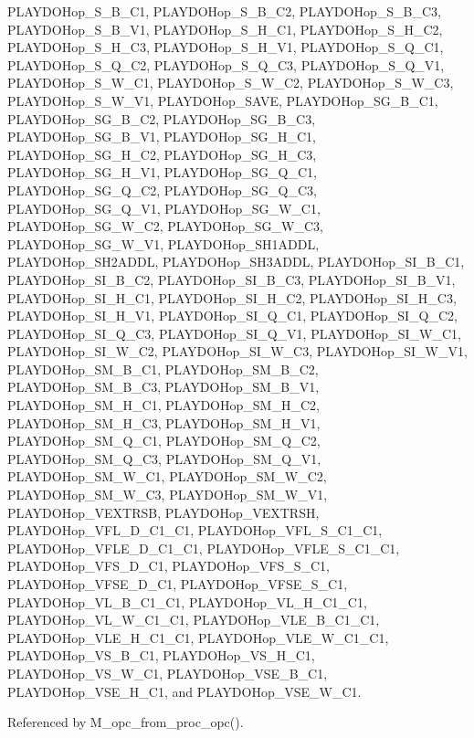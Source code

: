 PLAYDOHop\_\-S\_\-B\_\-C1, PLAYDOHop\_\-S\_\-B\_\-C2, PLAYDOHop\_\-S\_\-B\_\-C3, PLAYDOHop\_\-S\_\-B\_\-V1, PLAYDOHop\_\-S\_\-H\_\-C1, PLAYDOHop\_\-S\_\-H\_\-C2, PLAYDOHop\_\-S\_\-H\_\-C3, PLAYDOHop\_\-S\_\-H\_\-V1, PLAYDOHop\_\-S\_\-Q\_\-C1, PLAYDOHop\_\-S\_\-Q\_\-C2, PLAYDOHop\_\-S\_\-Q\_\-C3, PLAYDOHop\_\-S\_\-Q\_\-V1, PLAYDOHop\_\-S\_\-W\_\-C1, PLAYDOHop\_\-S\_\-W\_\-C2, PLAYDOHop\_\-S\_\-W\_\-C3, PLAYDOHop\_\-S\_\-W\_\-V1, PLAYDOHop\_\-SAVE, PLAYDOHop\_\-SG\_\-B\_\-C1, PLAYDOHop\_\-SG\_\-B\_\-C2, PLAYDOHop\_\-SG\_\-B\_\-C3, PLAYDOHop\_\-SG\_\-B\_\-V1, PLAYDOHop\_\-SG\_\-H\_\-C1, PLAYDOHop\_\-SG\_\-H\_\-C2, PLAYDOHop\_\-SG\_\-H\_\-C3, PLAYDOHop\_\-SG\_\-H\_\-V1, PLAYDOHop\_\-SG\_\-Q\_\-C1, PLAYDOHop\_\-SG\_\-Q\_\-C2, PLAYDOHop\_\-SG\_\-Q\_\-C3, PLAYDOHop\_\-SG\_\-Q\_\-V1, PLAYDOHop\_\-SG\_\-W\_\-C1, PLAYDOHop\_\-SG\_\-W\_\-C2, PLAYDOHop\_\-SG\_\-W\_\-C3, PLAYDOHop\_\-SG\_\-W\_\-V1, PLAYDOHop\_\-SH1ADDL, PLAYDOHop\_\-SH2ADDL, PLAYDOHop\_\-SH3ADDL, PLAYDOHop\_\-SI\_\-B\_\-C1, PLAYDOHop\_\-SI\_\-B\_\-C2, PLAYDOHop\_\-SI\_\-B\_\-C3, PLAYDOHop\_\-SI\_\-B\_\-V1, PLAYDOHop\_\-SI\_\-H\_\-C1, PLAYDOHop\_\-SI\_\-H\_\-C2, PLAYDOHop\_\-SI\_\-H\_\-C3, PLAYDOHop\_\-SI\_\-H\_\-V1, PLAYDOHop\_\-SI\_\-Q\_\-C1, PLAYDOHop\_\-SI\_\-Q\_\-C2, PLAYDOHop\_\-SI\_\-Q\_\-C3, PLAYDOHop\_\-SI\_\-Q\_\-V1, PLAYDOHop\_\-SI\_\-W\_\-C1, PLAYDOHop\_\-SI\_\-W\_\-C2, PLAYDOHop\_\-SI\_\-W\_\-C3, PLAYDOHop\_\-SI\_\-W\_\-V1, PLAYDOHop\_\-SM\_\-B\_\-C1, PLAYDOHop\_\-SM\_\-B\_\-C2, PLAYDOHop\_\-SM\_\-B\_\-C3, PLAYDOHop\_\-SM\_\-B\_\-V1, PLAYDOHop\_\-SM\_\-H\_\-C1, PLAYDOHop\_\-SM\_\-H\_\-C2, PLAYDOHop\_\-SM\_\-H\_\-C3, PLAYDOHop\_\-SM\_\-H\_\-V1, PLAYDOHop\_\-SM\_\-Q\_\-C1, PLAYDOHop\_\-SM\_\-Q\_\-C2, PLAYDOHop\_\-SM\_\-Q\_\-C3, PLAYDOHop\_\-SM\_\-Q\_\-V1, PLAYDOHop\_\-SM\_\-W\_\-C1, PLAYDOHop\_\-SM\_\-W\_\-C2, PLAYDOHop\_\-SM\_\-W\_\-C3, PLAYDOHop\_\-SM\_\-W\_\-V1, PLAYDOHop\_\-VEXTRSB, PLAYDOHop\_\-VEXTRSH, PLAYDOHop\_\-VFL\_\-D\_\-C1\_\-C1, PLAYDOHop\_\-VFL\_\-S\_\-C1\_\-C1, PLAYDOHop\_\-VFLE\_\-D\_\-C1\_\-C1, PLAYDOHop\_\-VFLE\_\-S\_\-C1\_\-C1, PLAYDOHop\_\-VFS\_\-D\_\-C1, PLAYDOHop\_\-VFS\_\-S\_\-C1, PLAYDOHop\_\-VFSE\_\-D\_\-C1, PLAYDOHop\_\-VFSE\_\-S\_\-C1, PLAYDOHop\_\-VL\_\-B\_\-C1\_\-C1, PLAYDOHop\_\-VL\_\-H\_\-C1\_\-C1, PLAYDOHop\_\-VL\_\-W\_\-C1\_\-C1, PLAYDOHop\_\-VLE\_\-B\_\-C1\_\-C1, PLAYDOHop\_\-VLE\_\-H\_\-C1\_\-C1, PLAYDOHop\_\-VLE\_\-W\_\-C1\_\-C1, PLAYDOHop\_\-VS\_\-B\_\-C1, PLAYDOHop\_\-VS\_\-H\_\-C1, PLAYDOHop\_\-VS\_\-W\_\-C1, PLAYDOHop\_\-VSE\_\-B\_\-C1, PLAYDOHop\_\-VSE\_\-H\_\-C1, and PLAYDOHop\_\-VSE\_\-W\_\-C1.

Referenced by M\_\-opc\_\-from\_\-proc\_\-opc().

